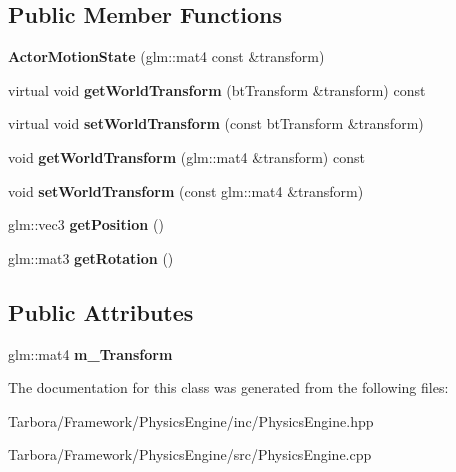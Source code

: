 \subsection*{Public Member Functions}
\begin{DoxyCompactItemize}
\item 
\mbox{\label{classTarbora_1_1ActorMotionState_a9f0f8dfe3b52a74c0dff5196629f28c9}} 
{\bfseries Actor\+Motion\+State} (glm\+::mat4 const \&transform)
\item 
\mbox{\label{classTarbora_1_1ActorMotionState_a6ca1b1961e95b7469e9dbef6d32f38e4}} 
virtual void {\bfseries get\+World\+Transform} (bt\+Transform \&transform) const
\item 
\mbox{\label{classTarbora_1_1ActorMotionState_a116151bb38d94aede50f35841bb03e6b}} 
virtual void {\bfseries set\+World\+Transform} (const bt\+Transform \&transform)
\item 
\mbox{\label{classTarbora_1_1ActorMotionState_aebdbbe65dc6e5b8826cc500baf5f0318}} 
void {\bfseries get\+World\+Transform} (glm\+::mat4 \&transform) const
\item 
\mbox{\label{classTarbora_1_1ActorMotionState_ac39c57708b091d92a0812f9cda68e7bb}} 
void {\bfseries set\+World\+Transform} (const glm\+::mat4 \&transform)
\item 
\mbox{\label{classTarbora_1_1ActorMotionState_ab79ee121003e3adda3c77c210dadc058}} 
glm\+::vec3 {\bfseries get\+Position} ()
\item 
\mbox{\label{classTarbora_1_1ActorMotionState_af57e028d47be8d142a01c61c25952eb0}} 
glm\+::mat3 {\bfseries get\+Rotation} ()
\end{DoxyCompactItemize}
\subsection*{Public Attributes}
\begin{DoxyCompactItemize}
\item 
\mbox{\label{classTarbora_1_1ActorMotionState_a89476c358757187de24d4917f4986b93}} 
glm\+::mat4 {\bfseries m\+\_\+\+Transform}
\end{DoxyCompactItemize}


The documentation for this class was generated from the following files\+:\begin{DoxyCompactItemize}
\item 
Tarbora/\+Framework/\+Physics\+Engine/inc/Physics\+Engine.\+hpp\item 
Tarbora/\+Framework/\+Physics\+Engine/src/Physics\+Engine.\+cpp\end{DoxyCompactItemize}
